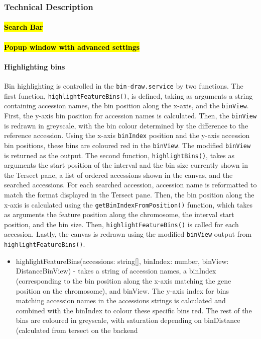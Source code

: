 \documentclass[12pt]{article}
\begin{document}
\begin{itemize}
\subsubsection{Technical Description}
\paragraph{\hl{Search Bar}}
\paragraph{\hl{Popup window with advanced settings }}
\paragraph{Highlighting bins}
Bin highlighting is controlled in the \verb+bin-draw.service+ by two functions. The first function, \verb+highlightFeatureBins()+, is defined, taking as arguments a string containing accession names, the bin position along the x-axis, and the \verb+binView+. First, the y-axis bin position for accession names is calculated. Then, the \verb+binView+ is redrawn in greyscale, with the bin colour determined by the difference to the reference accession. Using the x-axis \verb+binIndex+ position and the y-axis accession bin positions, these bins are coloured red in the \verb+binView+. The modified \verb+binView+ is returned as the output. The second function, \verb+highlightBins()+, takes as arguments the start position of the interval and the bin size currently shown in the Tersect pane, a list of ordered accessions shown in the canvas, and the searched accessions. For each searched accession, accession name is reformatted to match the format displayed in the Tersect pane. Then, the bin position along the x-axis is calculated using the \verb+getBinIndexFromPosition()+ function, which takes as arguments the feature position along the chromosome, the interval start position, and the bin size. Then, \verb+highlightFeatureBins()+ is called for each accession. Lastly, the canvas is redrawn using the modified \verb+binView+ output from \verb+highlightFeatureBins()+. 
\begin{itemize}
    \item highlightFeatureBins(accessions: string[], binIndex: number, binView: DistanceBinView) - takes a string of accession names, a binIndex (corresponding to the bin position along the x-axis matching the gene position on the chromosome), and binView. The y-axis index for bins matching accession names in the accessions strings is calculated and combined with the binIndex to colour these specific bins red. The rest of the bins are coloured in greyscale, with saturation depending on binDistance (calculated from tersect on the backend 

\end{itemize}
\end{itemize}
\end{document}
